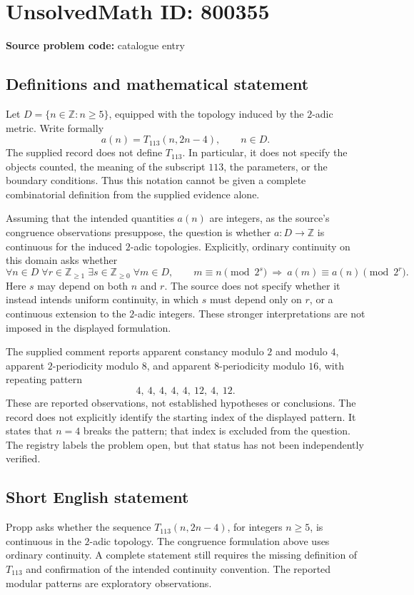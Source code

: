 \documentclass[11pt]{article}
\newcommand{\Z}{\mathbb{Z}}
\begin{document}
\section*{UnsolvedMath ID: 800355}
\textbf{Source problem code:} catalogue entry
\subsection{Definitions and mathematical statement}
Let \(D=\{n\in\Z:n\geq 5\}\), equipped with the topology induced by the \(2\)-adic metric. Write formally
\[
a(n)=T_{113}(n,2n-4),\qquad n\in D.
\]
The supplied record does not define \(T_{113}\). In particular, it does not specify the objects counted, the meaning of the subscript \(113\), the parameters, or the boundary conditions. Thus this notation cannot be given a complete combinatorial definition from the supplied evidence alone.

Assuming that the intended quantities \(a(n)\) are integers, as the source's congruence observations presuppose, the question is whether \(a:D\to\Z\) is continuous for the induced \(2\)-adic topologies. Explicitly, ordinary continuity on this domain asks whether
\[
\forall n\in D\;\forall r\in\Z_{\geq 1}\;\exists s\in\Z_{\geq 0}\;\forall m\in D,\qquad
m\equiv n\pmod{2^s}\ \Longrightarrow\ a(m)\equiv a(n)\pmod{2^r}.
\]
Here \(s\) may depend on both \(n\) and \(r\). The source does not specify whether it instead intends uniform continuity, in which \(s\) must depend only on \(r\), or a continuous extension to the \(2\)-adic integers. These stronger interpretations are not imposed in the displayed formulation.

The supplied comment reports apparent constancy modulo \(2\) and modulo \(4\), apparent \(2\)-periodicity modulo \(8\), and apparent \(8\)-periodicity modulo \(16\), with repeating pattern
\[
4,\ 4,\ 4,\ 4,\ 4,\ 12,\ 4,\ 12.
\]
These are reported observations, not established hypotheses or conclusions. The record does not explicitly identify the starting index of the displayed pattern. It states that \(n=4\) breaks the pattern; that index is excluded from the question. The registry labels the problem open, but that status has not been independently verified.
\subsection{Short English statement}
Propp asks whether the sequence \(T_{113}(n,2n-4)\), for integers \(n\geq 5\), is continuous in the \(2\)-adic topology. The congruence formulation above uses ordinary continuity. A complete statement still requires the missing definition of \(T_{113}\) and confirmation of the intended continuity convention. The reported modular patterns are exploratory observations.
\end{document}
